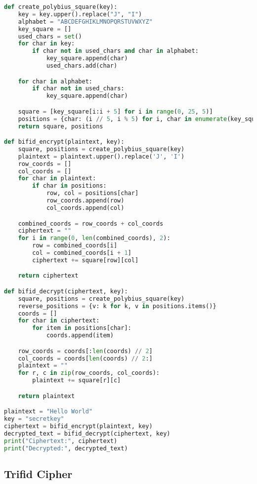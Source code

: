 \begin{lstlisting}[language=Python]
def create_polybius_square(key):
    key = key.upper().replace("J", "I")
    alphabet = "ABCDEFGHIKLMNOPQRSTUVWXYZ"
    key_square = []
    used_chars = set()
    for char in key:
        if char not in used_chars and char in alphabet:
            key_square.append(char)
            used_chars.add(char)

    for char in alphabet:
        if char not in used_chars:
            key_square.append(char)

    square = [key_square[i:i + 5] for i in range(0, 25, 5)]
    positions = {char: (i // 5, i % 5) for i, char in enumerate(key_square)}
    return square, positions

def bifid_encrypt(plaintext, key):
    square, positions = create_polybius_square(key)
    plaintext = plaintext.upper().replace('J', 'I')
    row_coords = []
    col_coords = []
    for char in plaintext:
        if char in positions:
            row, col = positions[char]
            row_coords.append(row)
            col_coords.append(col)

    combined_coords = row_coords + col_coords
    ciphertext = ""
    for i in range(0, len(combined_coords), 2):
        row = combined_coords[i]
        col = combined_coords[i + 1]
        ciphertext += square[row][col]

    return ciphertext

def bifid_decrypt(ciphertext, key):
    square, positions = create_polybius_square(key)
    reverse_positions = {v: k for k, v in positions.items()}
    coords = []
    for char in ciphertext:
        for item in positions[char]:
            coords.append(item)

    row_coords = coords[:len(coords) // 2]
    col_coords = coords[len(coords) // 2:]
    plaintext = ""
    for r, c in zip(row_coords, col_coords):
        plaintext += square[r][c]

    return plaintext

plaintext = "Hello World"
key = "secretkey"
ciphertext = bifid_encrypt(plaintext, key)
decrypted_text = bifid_decrypt(ciphertext, key)
print("Ciphertext:", ciphertext)
print("Decrypted:", decrypted_text)
\end{lstlisting}

\newpage

\subsection{Trifid Cipher}

